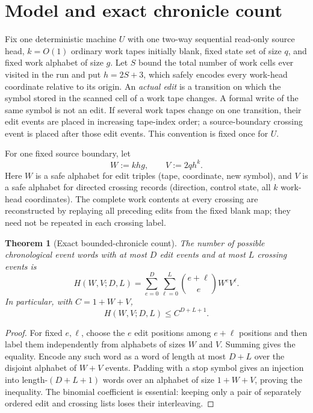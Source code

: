 \documentclass[11pt]{article}
\newtheorem{theorem}{Theorem}
\begin{document}
\section{Model and exact chronicle count}

Fix one deterministic machine $U$ with one two-way sequential read-only source head, $k=O(1)$ ordinary work tapes initially blank, fixed state set of size $q$, and fixed work alphabet of size $g$.  Let $S$ bound the total number of work cells ever visited in the run and put $h=2S+3$, which safely encodes every work-head coordinate relative to its origin.  An \emph{actual edit} is a transition on which the symbol stored in the scanned cell of a work tape changes.  A formal write of the same symbol is not an edit.  If several work tapes change on one transition, their edit events are placed in increasing tape-index order; a source-boundary crossing event is placed after those edit events.  This convention is fixed once for $U$.

For one fixed source boundary, let
\[
  W:=khg,\qquad V:=2qh^k.
\]
Here $W$ is a safe alphabet for edit triples (tape, coordinate, new symbol), and $V$ is a safe alphabet for directed crossing records (direction, control state, all $k$ work-head coordinates).  The complete work contents at every crossing are reconstructed by replaying all preceding edits from the fixed blank map; they need not be repeated in each crossing label.

\begin{theorem}[Exact bounded-chronicle count]
The number of possible chronological event words with at most $D$ edit events and at most $L$ crossing events is
\[
 H(W,V;D,L)=\sum_{e=0}^{D}\sum_{\ell=0}^{L}
 {e+\ell\choose e}W^eV^\ell.
\]
In particular, with $C=1+W+V$,
\[
 H(W,V;D,L)\le C^{D+L+1}.
\]
\end{theorem}

\begin{proof}
For fixed $e,\ell$, choose the $e$ edit positions among $e+\ell$ positions and then label them independently from alphabets of sizes $W$ and $V$.  Summing gives the equality.  Encode any such word as a word of length at most $D+L$ over the disjoint alphabet of $W+V$ events.  Padding with a stop symbol gives an injection into length-$(D+L+1)$ words over an alphabet of size $1+W+V$, proving the inequality.  The binomial coefficient is essential: keeping only a pair of separately ordered edit and crossing lists loses their interleaving.
\end{proof}
\end{document}
